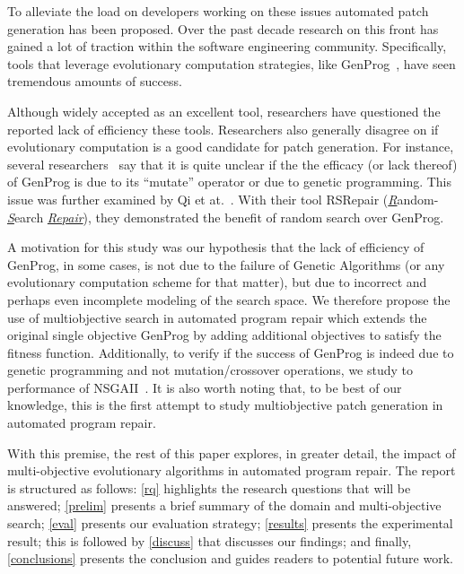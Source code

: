 \documentclass{sig-alternate}
\theoremstyle{break}
\newcommand{\tion}[1]{\textsection\ref{#1}}
\begin{document}
To alleviate the load on developers working on these issues automated patch generation has been proposed. Over the past decade research on this front has gained a lot of traction within the software engineering community. Specifically, tools that leverage evolutionary computation strategies, like GenProg~\cite{leGoues12}, have seen tremendous amounts of success. 

Although widely accepted as an excellent tool, researchers have questioned the reported lack of efficiency these tools. Researchers also generally disagree on if evolutionary computation is a good candidate for patch generation. For instance, several researchers~\cite{qi2014, kim2013, arcuri2011} say that it is quite unclear if the the efficacy (or lack thereof) of GenProg is due to its ``mutate'' operator or due to genetic programming. This issue was further examined by Qi et at.~\cite{qi2014}. With their tool RSRepair (\underline{\textit{R}}andom-\underline{\textit{S}}earch \underline{\textit{Repair}}), they demonstrated the benefit of random search over GenProg.

A motivation for this study was our hypothesis that the lack of efficiency of GenProg, in some cases, is not due to the failure of Genetic Algorithms (or any evolutionary computation scheme for that matter), but due to incorrect and perhaps even incomplete modeling of the search space. We therefore propose the use of multiobjective search in automated program repair which extends the original single objective GenProg by adding additional objectives to satisfy the fitness function. Additionally, to verify if the success of GenProg is indeed due to genetic programming and not mutation/crossover operations, we study to performance of NSGAII~\cite{nsgaii}. It is also worth noting that, to be best of our knowledge, this is the first attempt to study multiobjective patch generation in automated program repair. 

With this premise, the rest of this paper explores, in greater detail, the impact of multi-objective evolutionary algorithms in automated program repair. The report is structured as follows: \tion{rq} highlights the research questions that will be answered; \tion{prelim} presents a brief summary of the domain and multi-objective search; \tion{eval}
presents our evaluation strategy; \tion{results} presents the experimental result; this is followed by \tion{discuss} that discusses our findings; and finally, \tion{conclusions} presents the conclusion and guides readers to potential future work.
 
\end{document}
